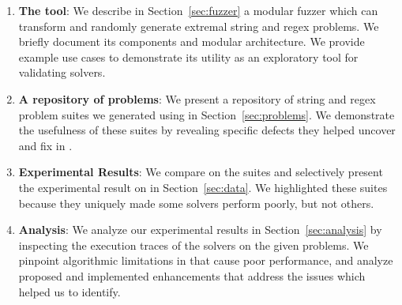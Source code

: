 \begin{enumerate}
\item \textbf{The \fuzzer{} tool}: We describe in
  Section~\ref{sec:fuzzer} a modular fuzzer which can transform and
  randomly generate extremal \smtfull{} string and regex problems. We
  briefly document its components and modular architecture. We provide
  example use cases to demonstrate its utility as an exploratory tool
  for validating solvers.
  
\item \textbf{A repository of \smtfull{} problems}: We present a
  repository of \smtfull{} string and regex problem suites we
  generated using \fuzzer{} in Section~\ref{sec:problems}. We
  demonstrate the usefulness of these suites by revealing specific
  defects they helped uncover and fix in \us{}.

\item \textbf{Experimental Results}: We compare \theSolvers{} on the
  \fuzzer{} suites and selectively present the experimental result on
  \theSuites{} in Section~\ref{sec:data}. We highlighted these suites
  because they uniquely made some solvers perform poorly, but not
  others.

\item \textbf{Analysis}: We analyze our experimental results in
  Section~\ref{sec:analysis} by inspecting the execution traces of the
  solvers on the given problems. We pinpoint algorithmic limitations
  in \us{} that cause poor performance, and analyze proposed and
  implemented enhancements that address the issues which \fuzzer{}
  helped us to identify.
\end{enumerate}
